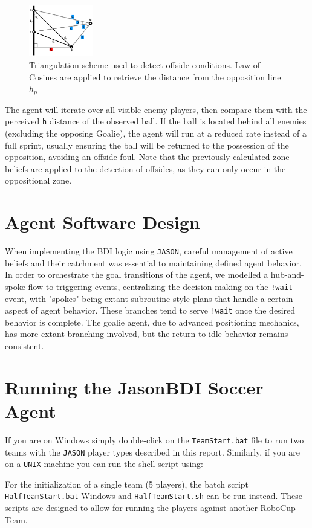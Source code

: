 \documentclass[conference]{IEEEtran}
\begin{document}
\begin{figure}[ht!]
        \centering\centerline{\includegraphics[width=0.25\textwidth]{Figures/triangulation.png}}
        \caption{Triangulation scheme used to detect offside conditions. Law of Cosines are applied to retrieve the distance from the opposition line $h_p$}
        \label{fig:offsideTriangulation}
\end{figure}

The agent will iterate over all visible enemy players, then compare them with the perceived \texttt{h} distance of the observed ball. If the ball is located behind all enemies (excluding the opposing Goalie), the agent will run at a reduced rate instead of a full sprint, usually ensuring the ball will be returned to the possession of the opposition, avoiding an offside foul. Note that the previously calculated zone beliefs are applied to the detection of offsides, as they can only occur in the oppositional zone.

\section{Agent Software Design}
When implementing the BDI logic using \texttt{JASON}, careful management of active beliefs and their catchment was essential to maintaining defined agent behavior. In order to orchestrate the goal transitions of the agent, we modelled a hub-and-spoke flow to triggering events, centralizing the decision-making on the \texttt{!wait} event, with "spokes" being extant subroutine-style plans that handle a certain aspect of agent behavior. These branches tend to serve \texttt{!wait} once the desired behavior is complete. The goalie agent, due to advanced positioning mechanics, has more extant branching involved, but the return-to-idle behavior remains consistent.

\section{Running the JasonBDI Soccer Agent}
If you are on Windows simply double-click on the \texttt{TeamStart.bat} file to run two teams with the \texttt{JASON} player types described in this report. Similarly, if you are on a \texttt{UNIX} machine you can run the shell script using: 
\noindent For the initialization of a single team (5 players), the batch script \texttt{HalfTeamStart.bat} Windows and \texttt{HalfTeamStart.sh} can be run instead. These scripts are designed to allow for running the players against another RoboCup Team.
\end{document}
